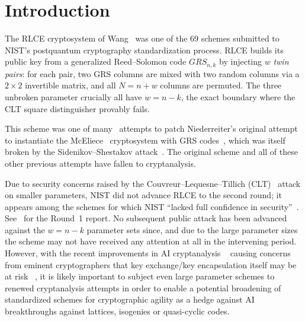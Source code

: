 \section{Introduction}

The RLCE cryptosystem of Wang~\cite{DBLP:journals/corr/Wang15aa, RLCE-spec} was one of the
69 schemes submitted to NIST's postquantum cryptography standardization
process. RLCE builds its public key from a generalized Reed--Solomon code
$GRS_{n,k}$ by injecting $w$ \emph{twin pairs}: for each pair, two GRS columns
are mixed with two random columns via a $2 \times 2$ invertible matrix, and all
$N = n + w$ columns are permuted. The three unbroken parameter crucially all
have $w = n-k$, the exact boundary where the CLT square distinguisher provably
fails.

This scheme was one of many~\cite{DBLP:conf/pqcrypt/Wieschebrink09,
      DBLP:journals/dcc/BaldiBC13, DBLP:conf/wcc/Wieschebrink16,
      DBLP:journals/iet-it/AlmeidaBNS24, DBLP:conf/redundancy/Krouk20} attempts to
patch Niederreiter's original attempt to instantiate the
McEliece~\cite{McEliece1978} cryptosystem with GRS
codes~\cite{DBLP:journals/dc/Niederreiter86}, which was itself broken by the
Sidenikov--Shestakov attack~\cite{sidelnikov1992insecurity}. The original
scheme and all of these other previous attempts have fallen to cryptanalysis.

Due to security concerns raised by the Couvreur--Lequesne--Tillich
(CLT)~\cite{CLT18} attack on smaller parameters, NIST did not advance RLCE to
the second round; it appears among the schemes for which NIST ``lacked full
confidence in security''~\cite{Moody19}. See~\cite{NIST8240} for the Round~1
report. No subsequent public attack has been advanced against the $w = n-k$
parameter sets since, and due to the large parameter sizes the scheme may not
have received any attention at all in the intervening period. However, with the
recent improvements in AI cryptanalysis ~\cite{cryptoeprint:2026/1593,
      cryptoeprint:2026/2266} causing concerns from eminent cryptographers that key
exchange/key encapsulation itself may be at risk ~\cite{green2026pkc}, it is
likely important to subject even large parameter schemes to renewed
cryptanalysis attempts in order to enable a potential broadening of
standardized schemes for cryptographic agility as a hedge against AI
breakthroughs against lattices, isogenies or quasi-cyclic codes.

